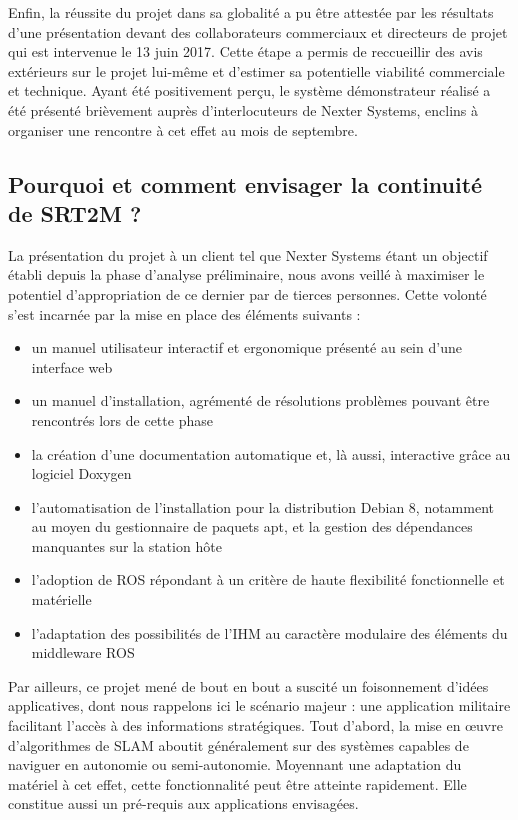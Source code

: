   Enfin, la réussite du projet dans sa globalité a pu être attestée par les résultats d'une présentation devant des collaborateurs commerciaux et directeurs de projet qui est intervenue le 13 juin 2017.
  Cette étape a permis de reccueillir des avis extérieurs sur le projet lui-même et d'estimer sa potentielle viabilité commerciale et technique. 
  Ayant été positivement perçu, le système démonstrateur réalisé a été présenté brièvement auprès d'interlocuteurs de Nexter Systems, enclins à organiser une rencontre à cet effet au mois de septembre. 
  
  \subsection{Pourquoi et comment envisager la continuité de SRT2M ?}
  
  La présentation du projet à un client tel que Nexter Systems étant un objectif établi depuis la phase d'analyse préliminaire, nous avons veillé à maximiser le potentiel d'appropriation de ce dernier par de tierces personnes.
  Cette volonté s'est incarnée par la mise en place des éléments suivants : 
  
  \begin{itemize}
   \item un manuel utilisateur interactif et ergonomique présenté au sein d'une interface web
   \item un manuel d'installation, agrémenté de résolutions problèmes pouvant être rencontrés lors de cette phase
   \item la création d'une documentation automatique et, là aussi, interactive grâce au logiciel Doxygen
   \item l'automatisation de l'installation pour la distribution Debian 8, notamment au moyen du gestionnaire de paquets apt, et la gestion des dépendances manquantes sur la station hôte
   \item l'adoption de ROS répondant à un critère de haute flexibilité fonctionnelle et matérielle
   \item l'adaptation des possibilités de l'IHM au caractère modulaire des éléments du middleware ROS 
  \end{itemize}
  
  
  Par ailleurs, ce projet mené de bout en bout a suscité un foisonnement d'idées applicatives, dont nous rappelons ici le scénario majeur : une application militaire facilitant l'accès à des informations stratégiques. 
  Tout d'abord, la mise en \oe{}uvre d'algorithmes de SLAM aboutit généralement sur des systèmes capables de naviguer en autonomie ou semi-autonomie. 
  Moyennant une adaptation du matériel à cet effet, cette fonctionnalité peut être atteinte rapidement. 
  Elle constitue aussi un pré-requis aux applications envisagées. 
  
